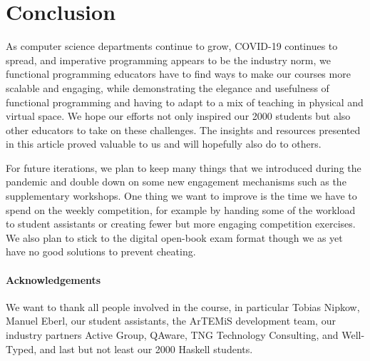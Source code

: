 \section{Conclusion}\label{sec:conclusion}

As computer science departments continue to grow,
COVID-19 continues to spread,
and imperative programming appears to be the industry norm,
we functional programming educators
have to find ways to make our courses more scalable and
engaging, while demonstrating the elegance and usefulness of functional programming and having to adapt to a mix of teaching in physical and virtual space.
We hope our efforts not only inspired our 2000 students
but also other educators to take on these challenges.
The insights and resources presented in this article proved valuable to us and will hopefully also do to others.

For future iterations,
we plan to keep many things that we introduced during the pandemic and double down on some new engagement mechanisms such as the supplementary workshops.
One thing we want to improve is the
time we have to spend on the weekly competition,
for example by handing some of the workload to student assistants or creating fewer but more engaging competition exercises.
We also plan to stick to the digital open-book exam format
though we as yet have no good solutions to prevent cheating.

\paragraph{Acknowledgements}
We want to thank all people involved in the course,
in particular Tobias Nipkow,
Manuel Eberl,
our student assistants,
the ArTEMiS development team,
our industry partners
Active Group,
QAware,
TNG Technology Consulting,
and Well-Typed,
and last but not least our 2000 Haskell students.

